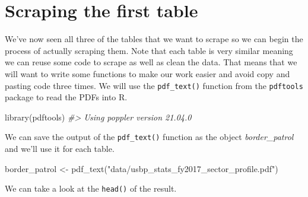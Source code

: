 \documentclass[
  12pt,
  openany]{book}
\newenvironment{Shaded}{\begin{snugshade}}{\end{snugshade}}
\newcommand{\CommentTok}[1]{\textcolor[rgb]{0.37,0.37,0.37}{\textit{#1}}}
\newcommand{\FunctionTok}[1]{\textcolor[rgb]{0,0,0}{#1}}
\newcommand{\NormalTok}[1]{#1}
\newcommand{\OtherTok}[1]{\textcolor[rgb]{0.37,0.37,0.37}{#1}}
\newcommand{\StringTok}[1]{\textcolor[rgb]{0.5,0.5,0.5}{#1}}
\begin{document}
\hypertarget{scraping-the-first-table}{%
\section{Scraping the first table}\label{scraping-the-first-table}}

We've now seen all three of the tables that we want to scrape so we can begin the process of actually scraping them. Note that each table is very similar meaning we can reuse some code to scrape as well as clean the data. That means that we will want to write some functions to make our work easier and avoid copy and pasting code three times. We will use the \texttt{pdf\_text()} function from the \texttt{pdftools} package to read the PDFs into R.

\begin{Shaded}
\begin{Highlighting}[]
\FunctionTok{library}\NormalTok{(pdftools)}
\CommentTok{\#\textgreater{} Using poppler version 21.04.0}
\end{Highlighting}
\end{Shaded}

We can save the output of the \texttt{pdf\_text()} function as the object \emph{border\_patrol} and we'll use it for each table.

\begin{Shaded}
\begin{Highlighting}[]
\NormalTok{border\_patrol }\OtherTok{\textless{}{-}} \FunctionTok{pdf\_text}\NormalTok{(}\StringTok{"data/usbp\_stats\_fy2017\_sector\_profile.pdf"}\NormalTok{)}
\end{Highlighting}
\end{Shaded}

We can take a look at the \texttt{head()} of the result.
\end{document}
